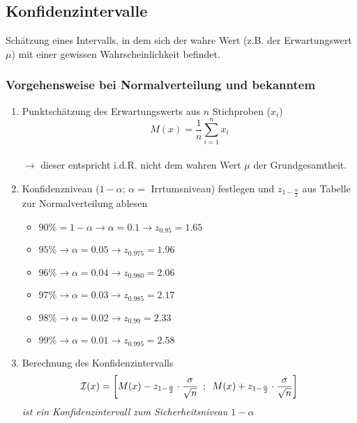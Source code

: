 \subsection{Konfidenzintervalle}

Schätzung eines Intervalls, in dem sich der wahre Wert (z.B. der Erwartungswert~\(\mu\)) mit einer gewissen Wahrscheinlichkeit befindet.

\subsubsection{Vorgehensweise bei Normalverteilung und \textbf{bekanntem} \boldmath{\(\sigma\)}}

\begin{enumerate}
    \item Punktschätzung des Erwartungswerts aus \(n\) Stichproben (\(x_i\))
            \[M(x)=\frac{1}{n}\sum_{i=1}^{n}x_i\]\\
            \(\rightarrow\) dieser entspricht i.d.R. nicht dem wahren Wert \(\mu\) der Grundgesamtheit.

    \item Konfidenzniveau (\(1-\alpha\); \(\alpha=\) Irrtumsniveau) festlegen und \(z_{1-\frac{\alpha}{2}}\) aus Tabelle zur Normalverteilung ablesen
        \begin{itemize}
            \item \(90\% = 1-\alpha \rightarrow \alpha=0.1\rightarrow z_{0.95}=1.65\)
            \item \(95\% \rightarrow \alpha=0.05\rightarrow z_{0.975}=1.96\)
            \item \(96\% \rightarrow \alpha=0.04\rightarrow z_{0.980}=2.06\)
            \item \(97\% \rightarrow \alpha=0.03\rightarrow z_{0.985}=2.17\)
            \item \(98\% \rightarrow \alpha=0.02\rightarrow z_{0.99}=2.33\)
            \item \(99\% \rightarrow \alpha=0.01\rightarrow z_{0.995}=2.58\)
        \end{itemize}
    \item Berechnung des Konfidenzintervalls
        \begin{equation*}
            \mathcal{I}(x) = \left[M(x) - z_{1-\frac{\alpha}{2}} \cdot \frac{\sigma}{\sqrt{n}}\hspace{0.5em}; \hspace{0.5em}M(x) + z_{1-\frac{\alpha}{2}} \cdot \frac{\sigma}{\sqrt{n}}\right]
        \end{equation*}
        \emph{ist ein Konfidenzintervall zum Sicherheitsniveau \(1-\alpha\)}\\
\end{enumerate}

